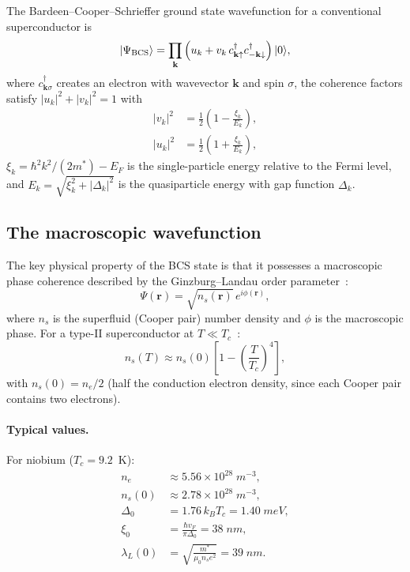\documentclass[12pt,aps,prd,twocolumn,superscriptaddress,nofootinbib]{revtex4-2}
\newcommand{\ee}[1]{\times 10^{#1}}
\begin{document}
The Bardeen--Cooper--Schrieffer ground state wavefunction for a
conventional superconductor is~\cite{BCS1957,Tinkham2004}
\begin{equation}\label{eq:bcs-state}
|\Psi_{\rm BCS}\rangle = \prod_{\mathbf{k}}
\left(u_k + v_k\,c^\dagger_{\mathbf{k}\uparrow}
c^\dagger_{-\mathbf{k}\downarrow}\right)|0\rangle,
\end{equation}
where $c^\dagger_{\mathbf{k}\sigma}$ creates an electron with
wavevector $\mathbf{k}$ and spin $\sigma$, the coherence factors
satisfy $|u_k|^2 + |v_k|^2 = 1$ with
\begin{align}
|v_k|^2 &= \frac{1}{2}\left(1 - \frac{\xi_k}{E_k}\right),
\label{eq:vk} \\
|u_k|^2 &= \frac{1}{2}\left(1 + \frac{\xi_k}{E_k}\right),
\label{eq:uk}
\end{align}
$\xi_k = \hbar^2 k^2/(2m^*) - E_F$ is the single-particle energy
relative to the Fermi level, and
$E_k = \sqrt{\xi_k^2 + |\Delta_k|^2}$ is the quasiparticle energy
with gap function $\Delta_k$.

\subsection{The macroscopic wavefunction}

The key physical property of the BCS state is that it possesses a
macroscopic phase coherence described by the Ginzburg--Landau
order parameter~\cite{Ginzburg1950,deGennes1999}:
\begin{equation}\label{eq:GL-order}
\Psi(\mathbf{r}) = \sqrt{n_s(\mathbf{r})}\,e^{i\phi(\mathbf{r})},
\end{equation}
where $n_s$ is the superfluid (Cooper pair) number density and
$\phi$ is the macroscopic phase. For a type-II superconductor at
$T \ll T_c$~\cite{Tinkham2004}:
\begin{equation}\label{eq:ns-T}
n_s(T) \approx n_s(0)\left[1 - \left(\frac{T}{T_c}\right)^4\right],
\end{equation}
with $n_s(0) = n_e/2$ (half the conduction electron density, since
each Cooper pair contains two electrons).

\paragraph{Typical values.}
For niobium ($T_c = 9.2$~K):
\begin{align}
n_e &\approx 5.56\ee{28}\;\si{m^{-3}},
\label{eq:ne-Nb} \\
n_s(0) &\approx 2.78\ee{28}\;\si{m^{-3}},
\label{eq:ns-Nb} \\
\Delta_0 &= 1.76\,k_B T_c = 1.40\;\si{meV},
\label{eq:Delta-Nb} \\
\xi_0 &= \frac{\hbar v_F}{\pi\Delta_0} = 38\;\si{nm},
\label{eq:xi-Nb} \\
\lambda_L(0) &= \sqrt{\frac{m^*}{\mu_0 n_s e^2}} = 39\;\si{nm}.
\label{eq:lambdaL-Nb}
\end{align}
\end{document}
